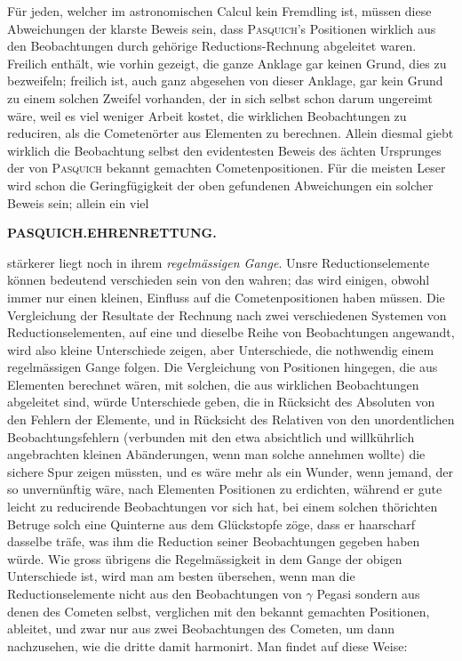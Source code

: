 Für jeden, welcher im astronomischen Calcul kein Fremdling ist, müssen diese
Abweichungen der klarste Beweis sein, dass \textsc{Pasquich}'s Positionen wirklich
aus den Beobachtungen durch gehörige Reductions-Rechnung abgeleitet waren.
Freilich enthält, wie vorhin gezeigt, die ganze Anklage gar keinen Grund, dies zu
bezweifeln; freilich ist, auch ganz abgesehen von dieser Anklage, gar kein Grund zu
einem solchen Zweifel vorhanden, der in sich selbst schon darum ungereimt wäre,
weil es viel weniger Arbeit kostet, die wirklichen Beobachtungen zu reduciren, als
die Cometenörter aus Elementen zu berechnen. Allein diesmal giebt wirklich die
Beobachtung selbst den evidentesten Beweis des ächten Ursprunges der von
\textsc{Pasquich} bekannt gemachten Cometenpositionen. Für die meisten Leser wird
schon die Geringfügigkeit der oben gefundenen Abweichungen ein solcher Beweis
sein; allein ein viel\par
\clearpage
\thispagestyle{empty}
\noindent{}%
\makebox[12mm][l]{}%
\parbox[t]{\dimexpr\linewidth-24mm\relax}{\centering\footnotesize\bfseries PASQUICH.\enspace EHRENRETTUNG.\par}%
\par\medskip
\enlargethispage{1pt}
\noindent stärkerer liegt noch in ihrem \emph{regelmässigen Gange}. Unsre Reductionselemente können bedeutend
verschieden sein von den wahren; das wird einigen, obwohl immer nur einen kleinen, Einfluss auf die
Cometenpositionen haben müssen. Die Vergleichung der Resultate der Rechnung nach zwei verschiedenen
Systemen von Reductionselementen, auf eine und dieselbe Reihe von Beobachtungen angewandt, wird
also kleine Unterschiede zeigen, aber Unterschiede, die nothwendig einem regelmässigen Gange
folgen. Die Vergleichung von Positionen hingegen, die aus Elementen berechnet wären, mit solchen,
die aus wirklichen Beobachtungen abgeleitet sind, würde Unterschiede geben, die in Rücksicht des
Absoluten von den Fehlern der Elemente, und in Rücksicht des Relativen von den unordentlichen
Beobachtungsfehlern (verbunden mit den etwa absichtlich und willkührlich angebrachten kleinen
Abänderungen, wenn man solche annehmen wollte) die sichere Spur zeigen müssten, und es wäre mehr
als ein Wunder, wenn jemand, der so unvernünftig wäre, nach Elementen Positionen zu erdichten,
während er gute leicht zu reducirende Beobachtungen vor sich hat, bei einem solchen thörichten
Betruge solch eine Quinterne aus dem Glückstopfe zöge, dass er haarscharf dasselbe träfe, was ihm
die Reduction seiner Beobachtungen gegeben haben würde. Wie gross übrigens die Regelmässigkeit in
dem Gange der obigen Unterschiede ist, wird man am besten übersehen, wenn man die
Reductionselemente nicht aus den Beobachtungen von $\gamma$ Pegasi sondern aus denen des Cometen
selbst, verglichen mit den bekannt gemachten Positionen, ableitet, und zwar nur aus zwei
Beobachtungen des Cometen, um dann nachzusehen, wie die dritte damit harmonirt. Man findet auf diese Weise:

